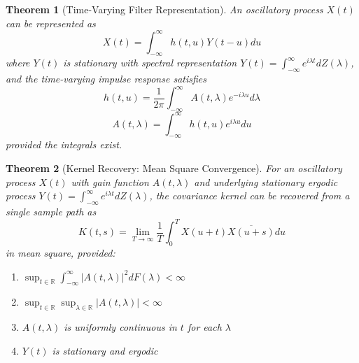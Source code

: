 \documentclass{article}
\newtheorem{theorem}{Theorem}
\begin{document}
\begin{theorem}[Time-Varying Filter Representation]\label{thm:filter}
An oscillatory process $X(t)$ can be represented as
\[
X(t) = \int_{-\infty}^{\infty} h(t,u) Y(t-u) du
\]
where $Y(t)$ is stationary with spectral representation $Y(t) = \int_{-\infty}^{\infty} e^{i\lambda t} dZ(\lambda)$, and the time-varying impulse response satisfies
\[
h(t,u) = \frac{1}{2\pi} \int_{-\infty}^{\infty} A(t,\lambda) e^{-i\lambda u} d\lambda
\]
\[
A(t,\lambda) = \int_{-\infty}^{\infty} h(t,u) e^{i\lambda u} du
\]
provided the integrals exist.
\end{theorem}

\begin{theorem}[Kernel Recovery: Mean Square Convergence]\label{thm:kernel}
For an oscillatory process $X(t)$ with gain function $A(t,\lambda)$ and underlying stationary ergodic process $Y(t) = \int_{-\infty}^{\infty} e^{i\lambda t} dZ(\lambda)$, the covariance kernel can be recovered from a single sample path as
\[
K(t,s) = \lim_{T \to \infty} \frac{1}{T} \int_0^T X(u+t) \overline{X(u+s)} du
\]
in mean square, provided:
\begin{enumerate}
\item \label{cond:uniformL2} $\sup_{t \in \mathbb{R}} \int_{-\infty}^{\infty} |A(t,\lambda)|^2 dF(\lambda) < \infty$
\item \label{cond:uniformBound} $\sup_{t \in \mathbb{R}} \sup_{\lambda \in \mathbb{R}} |A(t,\lambda)| < \infty$
\item \label{cond:unifCont} $A(t,\lambda)$ is uniformly continuous in $t$ for each $\lambda$
\item \label{cond:ergodic} $Y(t)$ is stationary and ergodic
\end{enumerate}
\end{theorem}
\end{document}
